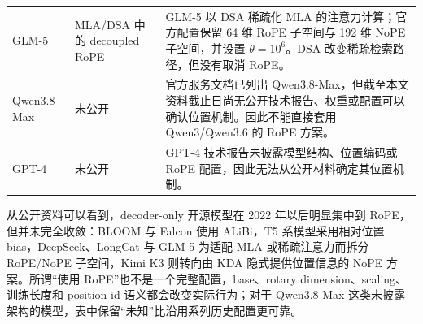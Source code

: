 \documentclass[UTF8,fontset=none,a4paper,10pt]{ctexart}
\begin{document}
\begin{longtable}{@{}p{2.7cm}p{3.6cm}p{8.0cm}@{}}
GLM-5 & MLA/DSA 中的 decoupled RoPE & GLM-5 以 DSA 稀疏化 MLA 的注意力计算；官方配置保留 64 维 RoPE 子空间与 192 维 NoPE 子空间，并设置 $\theta=10^6$。DSA 改变稀疏检索路径，但没有取消 RoPE\cite{glm5,glm5config}。\\

Qwen3.8-Max & 未公开 & 官方服务文档已列出 Qwen3.8-Max，但截至本文资料截止日尚无公开技术报告、权重或配置可以确认位置机制。因此不能直接套用 Qwen3/Qwen3.6 的 RoPE 方案\cite{qwen38docs}。\\

GPT-4 & 未公开 & GPT-4 技术报告未披露模型结构、位置编码或 RoPE 配置，因此无法从公开材料确定其位置机制\cite{openai2023gpt4}。\\

\end{longtable}

从公开资料可以看到，decoder-only 开源模型在 2022 年以后明显集中到 RoPE，但并未完全收敛：BLOOM 与 Falcon 使用 ALiBi，T5 系模型采用相对位置 bias，DeepSeek、LongCat 与 GLM-5 为适配 MLA 或稀疏注意力而拆分 RoPE/NoPE 子空间，Kimi K3 则转向由 KDA 隐式提供位置信息的 NoPE 方案。所谓“使用 RoPE”也不是一个完整配置，base、rotary dimension、scaling、训练长度和 position-id 语义都会改变实际行为；对于 Qwen3.8-Max 这类未披露架构的模型，表中保留“未知”比沿用系列历史配置更可靠。
\end{document}
